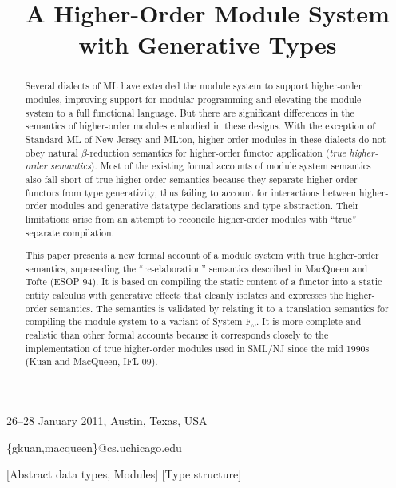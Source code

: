 \documentclass[9pt,nocopyrightspace, fleqn]{sigplanconf}
\begin{document}
	 {26--28 January 2011, Austin, Texas, USA}
	
\title{A Higher-Order Module System with Generative Types}
  {\{gkuan,macqueen\}@cs.uchicago.edu}
\maketitle

\begin{abstract}
  Several dialects of ML have extended the module system to support
  higher-order modules, improving support for modular programming and
  elevating the module system to a full functional language. But there
  are significant differences in the semantics of higher-order modules
  embodied in these designs. With the exception of Standard ML of New
  Jersey and MLton, higher-order modules in these dialects do not obey
  natural $\beta$-reduction semantics for higher-order functor
  application (\emph{true higher-order semantics}). Most of the
  existing formal accounts of module system semantics also fall short
  of true higher-order semantics because they separate higher-order
  functors from type generativity, thus failing to account for
  interactions between higher-order modules and generative datatype
  declarations and type abstraction. Their limitations arise from an
  attempt to reconcile higher-order modules with ``true'' separate
  compilation.
          
  This paper presents a new formal account of a module system with
  true higher-order semantics, superseding the ``re-elaboration''
  semantics described in MacQueen and Tofte (ESOP 94). It is based on
  compiling the static content of a functor into a static entity
  calculus with generative effects that cleanly isolates and expresses
  the higher-order semantics. The semantics is validated by relating
  it to a translation semantics for compiling the module system to a
  variant of System F$_\omega$. It is more complete and realistic than
  other formal accounts because it corresponds closely to the
  implementation of true higher-order modules used in SML/NJ since the
  mid 1990s (Kuan and MacQueen, IFL 09).
\end{abstract}

[Abstract data types, Modules] 
[Type structure]
\end{document}
